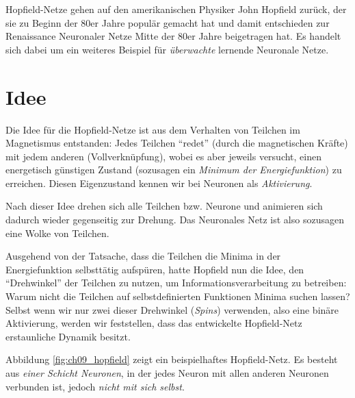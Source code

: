 Hopfield-Netze gehen auf den amerikanischen Physiker John Hopfield zurück, der sie zu Beginn der 80er Jahre populär gemacht hat und damit entschieden zur Renaissance Neuronaler Netze Mitte der 80er Jahre beigetragen hat. Es handelt sich dabei um ein weiteres Beispiel für \emph{überwachte} lernende Neuronale Netze.



\section*{Idee}
Die Idee für die Hopfield-Netze ist aus dem Verhalten von Teilchen im Magnetismus entstanden: Jedes Teilchen "`redet"' (durch die magnetischen Kräfte) mit jedem anderen (Vollverknüpfung), wobei es aber jeweils versucht, einen energetisch günstigen Zustand (sozusagen ein \emph{Minimum der Energiefunktion}) zu erreichen. Diesen Eigenzustand kennen wir bei Neuronen als \emph{Aktivierung}.

Nach dieser Idee drehen sich alle Teilchen bzw. Neurone und animieren sich dadurch wieder gegenseitig zur Drehung. Das Neuronales Netz ist also sozusagen eine Wolke von Teilchen.

Ausgehend von der Tatsache, dass die Teilchen die Minima in der Energiefunktion selbsttätig aufspüren, hatte Hopfield nun die Idee, den "`Drehwinkel"' der Teilchen zu nutzen, um Informationsverarbeitung zu betreiben: Warum nicht die Teilchen auf selbstdefinierten Funktionen Minima suchen lassen? Selbst wenn wir nur zwei dieser Drehwinkel (\emph{Spins}) verwenden, also eine binäre Aktivierung, werden wir feststellen, dass das entwickelte Hopfield-Netz erstaunliche Dynamik besitzt.


Abbildung \ref{fig:ch09_hopfield} zeigt ein beispielhaftes Hopfield-Netz. Es besteht aus \emph{einer Schicht Neuronen}, in der jedes Neuron mit allen anderen Neuronen verbunden ist, jedoch \emph{nicht mit sich selbst}.

